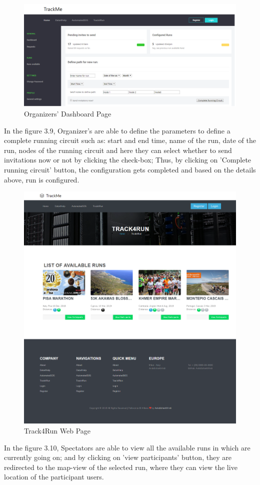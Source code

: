\documentclass[a4paper, hidelinks, 12pt]{report}
\begin{document}
	\begin{figure}[H]
		\centering
		\includegraphics[scale=0.35]{UI/db_organizer2.png}
		\caption[UI: Organizers' Dashboard Page]{Organizers' Dashboard Page}
		\label{fig:Dashboard for Organizer}
	\end{figure}
	In the figure 3.9, Organizer's are able to define the parameters to define a complete running circuit such as: start and end time, name of the run, date of the run, nodes of the running circuit and here they can select whether to send invitations now or not by clicking the check-box; Thus, by clicking on 'Complete running circuit' button, the configuration gets completed and based on the details above, run is configured.
	
	\begin{figure}[H]
		\centering
		\includegraphics[scale=0.35]{UI/track4run.png}
		\caption[UI: Track4Run Web Page]{Track4Run Web Page}
		\label{fig:Track4Run Web Page}
	\end{figure}
	In the figure 3.10, Spectators are able to view all the available runs in which are currently going on; and by clicking on 'view participants' button, they are redirected to the map-view of the selected run, where they can view the live location of the participant users.
	
\end{document}
